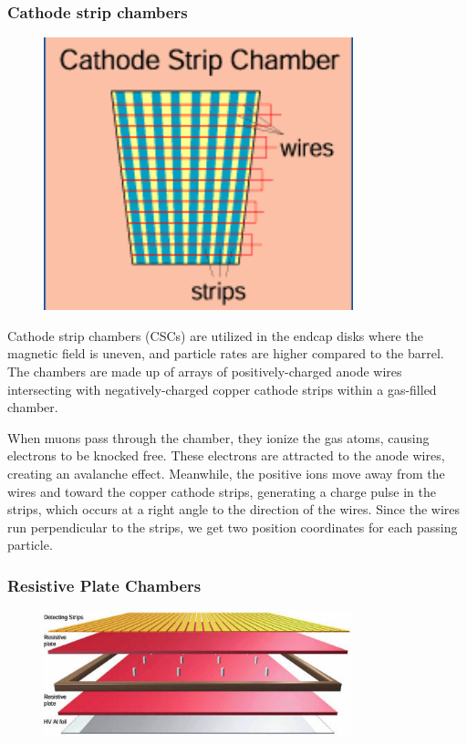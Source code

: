\subsubsection{Cathode strip chambers}

\begin{figure}
\centering
\includegraphics[width=0.80\textwidth]{figures/CSC.png}
\caption{}
\label{fig:CSC}
\end{figure}    

Cathode strip chambers (CSCs) are utilized in the endcap disks where the magnetic field is uneven, and particle rates are higher compared to the barrel. The chambers are made up of arrays of positively-charged anode wires intersecting with negatively-charged copper cathode strips within a gas-filled chamber. 

When muons pass through the chamber, they ionize the gas atoms, causing electrons to be knocked free. These electrons are attracted to the anode wires, creating an avalanche effect. Meanwhile, the positive ions move away from the wires and toward the copper cathode strips, generating a charge pulse in the strips, which occurs at a right angle to the direction of the wires. Since the wires run perpendicular to the strips, we get two position coordinates for each passing particle.

\subsubsection{Resistive Plate Chambers}

\begin{figure}
\centering
\includegraphics[width=0.80\textwidth]{figures/RPClayers.jpg}
\caption{}
\label{fig:RPClayers}
\end{figure}

